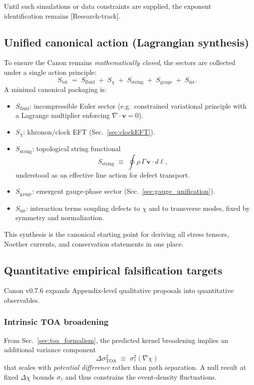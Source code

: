 \documentclass[10pt]{article}
\newcommand{\statusResearch}{\textsf{[Research-track]}}
\begin{document}
Until such simulations or data constraints are supplied, the exponent identification remains
\statusResearch.

\subsection{Unified canonical action (Lagrangian synthesis)}
\label{sec:unified_action_synthesis}

To ensure the Canon remains \emph{mathematically closed}, the sectors are collected under a single
action principle:
\begin{equation}
S_{\mathrm{tot}} \;=\; S_{\mathrm{fluid}} \;+\; S_{\chi} \;+\; S_{\mathrm{string}} \;+\; S_{\mathrm{gauge}} \;+\; S_{\mathrm{int}}.
\end{equation}
A minimal canonical packaging is:
\begin{itemize}
\item $S_{\mathrm{fluid}}$: incompressible Euler sector (e.g.\ constrained variational principle with a Lagrange multiplier enforcing $\nabla\cdot\mathbf{v}=0$).
\item $S_{\chi}$: khronon/clock EFT (Sec.~\ref{sec:clockEFT}).
\item $S_{\mathrm{string}}$: topological string functional
\begin{equation}
S_{\mathrm{string}}\;\equiv\;\oint \rho\,\Gamma\,\mathbf{v}\cdot d\boldsymbol{\ell},
\end{equation}
understood as an effective line action for defect transport.
\item $S_{\mathrm{gauge}}$: emergent gauge-phase sector (Sec.~\ref{sec:gauge_unification}).
\item $S_{\mathrm{int}}$: interaction terms coupling defects to $\chi$ and to transverse modes, fixed by symmetry and normalization.
\end{itemize}
This synthesis is the canonical starting point for deriving all stress tensors, Noether currents,
and conservation statements in one place.

\subsection{Quantitative empirical falsification targets}
\label{sec:quant_falsifiers}

Canon v0.7.6 expands Appendix-level qualitative proposals into quantitative observables.

\subsubsection{Intrinsic TOA broadening}
From Sec.~\ref{sec:toa_formalism}, the predicted kernel broadening implies an additional variance
component
\begin{equation}
\Delta\sigma_{\mathrm{TOA}}^2 \;\equiv\; \sigma_\tau^2(\nabla\chi)
\end{equation}
that scales with \emph{potential difference} rather than path separation. A null result at fixed
$\Delta\chi$ bounds $\sigma_\tau$ and thus constrains the event-density fluctuations.
\end{document}
